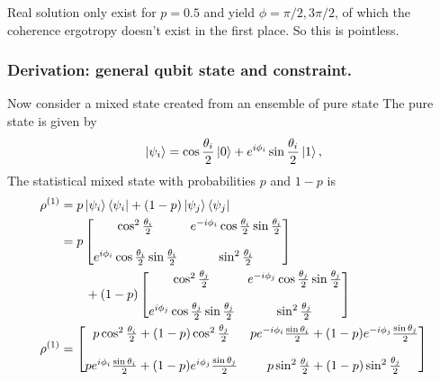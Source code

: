 \documentclass[../../../main.tex]{subfiles}
\begin{document}
Real solution only exist for $p=0.5$ and yield $\phi=\pi/2,3\pi/2$, of which the coherence ergotropy doesn't exist in the first place.
So this is pointless.

\subsubsection{Derivation: general qubit state and constraint.}
Now consider a mixed state created from an ensemble of pure state
The pure state is given by
\begin{equation*}
  \ket{\psi_i}
  =
  \cos\frac{\theta_i}{2}\ket{0}
  +
  e^{i\phi_i}\sin\frac{\theta_i}{2}\ket{1},
\end{equation*}
The statistical mixed state with probabilities \(p\) and \(1-p\) is
\begin{align*}
  \rho^{(1)}
             & =
  p\ket{\psi_i}\bra{\psi_i}
  +
  (1-p)\ket{\psi_j}\bra{\psi_j}                              \\
             & =
  p
  \begin{bmatrix}
    \cos^2\frac{\theta_i}{2}
     &
    e^{-i\phi_i}\cos\frac{\theta_i}{2}\sin\frac{\theta_i}{2} \\\\
    e^{i\phi_i}\cos\frac{\theta_i}{2}\sin\frac{\theta_i}{2}
     &
    \sin^2\frac{\theta_i}{2}
  \end{bmatrix} \\
             & \qquad
  +(1-p)
  \begin{bmatrix}
    \cos^2\frac{\theta_j}{2}
     &
    e^{-i\phi_j}\cos\frac{\theta_j}{2}\sin\frac{\theta_j}{2} \\\\
    e^{i\phi_j}\cos\frac{\theta_j}{2}\sin\frac{\theta_j}{2}
     &
    \sin^2\frac{\theta_j}{2}
  \end{bmatrix} \\
  \rho^{(1)} & =
  \begin{bmatrix}
    p\cos^2\frac{\theta_i}{2}
    +(1-p)\cos^2\frac{\theta_j}{2}
     &
    p e^{-i\phi_i}\frac{\sin \theta_i}{2}
    +(1-p)e^{-i\phi_j}\frac{\sin \theta_j}{2}
    \\\\
    p e^{i\phi_i}\frac{\sin \theta_i}{2}
    +(1-p)e^{i\phi_j}\frac{\sin \theta_j}{2}
     &
    p\sin^2\frac{\theta_i}{2}
    +(1-p)\sin^2\frac{\theta_j}{2}
  \end{bmatrix}
\end{align*}
\end{document}
